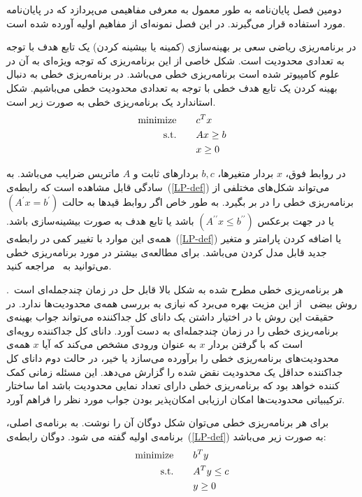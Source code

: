 

دومین فصل پایان‌نامه به طور معمول به معرفی مفاهیمی می‌پردازد که در پایان‌نامه مورد استفاده قرار می‌گیرند.
در این فصل نمونه‌ای از مفاهیم اولیه آورده شده است.



در برنامه‌ریزی‌ ریاضی سعی بر بهینه‌سازی (کمینه یا بیشینه کردن) یک تابع هدف با توجه به تعدادی محدودیت است. شکل خاصی از این برنامه‌ریزی که توجه ويژه‌ای به آن در علوم کامپیوتر شده است برنامه‌ریزی خطی می‌باشد. در برنامه‌ریزی خطی به دنبال بهینه کردن یک تابع هدف خطی با توجه به تعدادی محدودیت خطی می‌باشیم. شکل استاندارد یک برنامه‌ریزی خطی به صورت زیر است.
\begin{alignat}{3}
\text{minimize}   & \quad &&  c^T x       \label{LP-def}  \\
\text{s.t.}           & &&  Ax \geq b   \notag           \\
                       	& &&   x \geq 0     \notag 
\end{alignat}

در روابط فوق، $x$ بردار متغیرها،  $b, c$ بردارهای ثابت و $A$ ماتریس ضرایب می‌باشد. به سادگی قابل مشاهده است که رابطه‌ی~(\ref{LP-def}) می‌تواند شکل‌های مختلفی از برنامه‌ریزی خطی را در بر بگیرد. به طور خاص اگر روابط قید‌ها به حالت $(A^\prime x=b^ \prime)$ یا در جهت برعکس $(A^{\prime\prime} x \leq b^{\prime\prime} )$ باشد یا تابع هدف به صورت بیشینه‌سازی باشد. همه‌ی این موارد با تغییر کمی در رابطه‌ی~(\ref{LP-def}) یا اضافه کردن پارامتر و متغیر جدید قابل مدل کردن می‌باشد. برای مطالعه‌ی بیشتر در مورد برنامه‌ریزی خطی می‌توانید به~\cite{Sch86}  مراجعه کنید.

هر برنامه‌ریزی خطی مطرح شده به شکل بالا قابل حل در زمان چندجمله‌ای است~\cite{Kha79,Kar84}. روش بیضی~\cite{Kha79} از این مزیت بهره می‌برد که نیازی به بررسی همه‌ی محدودیت‌ها ندارد. در حقیقت این روش با در اختیار داشتن یک دانای کل جداکننده می‌تواند جواب بهینه‌ی برنامه‌ریزی خطی را در زمان چندجمله‌ای به دست آورد. دانای کل جداکننده رویه‌ای است که با گرفتن بردار $x$ به عنوان ورودی مشخص می‌کند که آیا $x$ همه‌ی محدودیت‌های برنامه‌ریزی خطی را برآورده می‌سازد یا خیر‌، در حالت دوم دانای کل جداکننده حداقل یک محدودیت نقض شده را گزارش می‌دهد. این مسئله زمانی کمک کننده خواهد بود که برنامه‌ریزی خطی دارای تعداد نمایی محدودیت باشد اما ساختار ترکیبیاتی محدودیت‌ها امکان ارزیابی امکان‌پذیر بودن جواب مورد نظر را فراهم آورد.

برای هر برنامه‌ریزی خطی می‌توان شکل دوگان آن را نوشت. به برنامه‌ی اصلی، برنامه‌ی اولیه گفته  می شود. دوگان رابطه‌ی~(\ref{LP-def}) به صورت زیر می‌باشد:
\begin{alignat}{3}
\text{minimize}   & \quad &&    b^T y           \label{DUAL-def}  \\
\text{s.t.}          &  &&    A^T y \leq c  \notag  \\
                       &  &&	y \geq 0        \notag 
\end{alignat}

